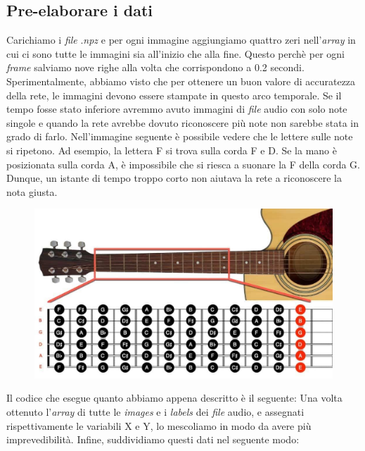 \subsection{Pre-elaborare i dati}
Carichiamo i \textit{file} .\textit{npz} e per ogni immagine aggiungiamo quattro zeri nell'\textit{array} in cui ci sono tutte le immagini sia all'inizio che alla fine. Questo perchè per ogni \textit{frame} salviamo nove righe alla volta che corrispondono a 0.2 secondi.\\
\newline
Sperimentalmente, abbiamo visto che per ottenere un buon valore di accuratezza della rete, le immagini devono essere stampate in questo arco temporale. Se il tempo fosse stato inferiore avremmo avuto immagini di \textit{file} audio con solo note singole e quando la rete avrebbe dovuto riconoscere più note non sarebbe stata in grado di farlo.  Nell’immagine seguente è possibile vedere che le lettere sulle note si ripetono.  Ad esempio, la lettera F si trova sulla corda F e D. Se la mano è posizionata sulla corda A, è impossibile che si riesca a suonare la F della corda G. Dunque, un istante di tempo troppo corto non aiutava la rete a riconoscere la nota giusta.
\begin{figure}[H]
	\centering
	\includegraphics[scale=0.30]{./images/img12.jpg}
\end{figure}
Il codice che esegue quanto abbiamo appena descritto è il seguente:
\vspace*{2ex}
\vspace*{2ex}
Una volta ottenuto l'\textit{array} di tutte le \textit{images} e i \textit{labels} dei \textit{file} audio, e assegnati rispettivamente le variabili X e Y, lo mescoliamo in modo da avere più imprevedibilità. Infine, suddividiamo questi dati nel seguente modo:
